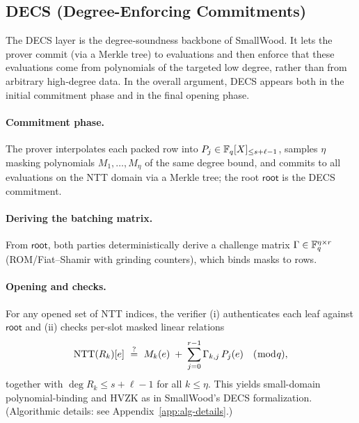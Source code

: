 

\subsection{DECS (Degree-Enforcing Commitments)}
\label{subsec:decs}

The DECS layer is the degree‑soundness backbone of SmallWood. It lets the prover commit (via a Merkle tree) to evaluations and then enforce that these evaluations come from polynomials of the targeted low degree, rather than from arbitrary high‑degree data. In the overall argument, DECS appears both in the initial commitment phase and in the final opening phase.

\paragraph{Commitment phase.}
The prover interpolates each packed row into $P_j\in\mathbb{F}_q[X]_{\le s+\ell-1}$, samples $\eta$ masking polynomials $M_1,\dots,M_\eta$ of the same degree bound, and commits to all evaluations on the NTT domain via a Merkle tree; the root $\mathsf{root}$ is the DECS commitment.

\paragraph{Deriving the batching matrix.}
From $\mathsf{root}$, both parties deterministically derive a challenge matrix $\Gamma\in\mathbb{F}_q^{\eta\times r}$ (ROM/Fiat--Shamir with grinding counters), which binds masks to rows.

\paragraph{Opening and checks.}
For any opened set of NTT indices, the verifier (i) authenticates each leaf against $\mathsf{root}$ and (ii) checks per-slot masked linear relations
\[
\NTT(R_k)[e]\ \stackrel{?}{=}\ M_k(e)\;+\;\sum_{j=0}^{r-1}\Gamma_{k,j}\,P_j(e)\quad(\bmod q),
\]
together with $\deg R_k\le s+\ell-1$ for all $k\le\eta$. This yields small-domain polynomial-binding and HVZK as in SmallWood’s DECS formalization. (Algorithmic details: see Appendix~\ref{app:alg-details}.)

